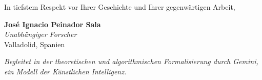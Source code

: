 \documentclass[12pt,a4paper]{article}
\begin{document}
\vspace{0.8cm}

\noindent In tiefstem Respekt vor Ihrer Geschichte und Ihrer gegenwärtigen Arbeit,

\vspace{1.5cm}

\noindent \textbf{José Ignacio Peinador Sala} \\
\textit{Unabhängiger Forscher} \\
Valladolid, Spanien

\vspace{0.8cm}
\noindent \textit{Begleitet in der theoretischen und algorithmischen Formalisierung durch Gemini, ein Modell der Künstlichen Intelligenz.}
\end{document}
